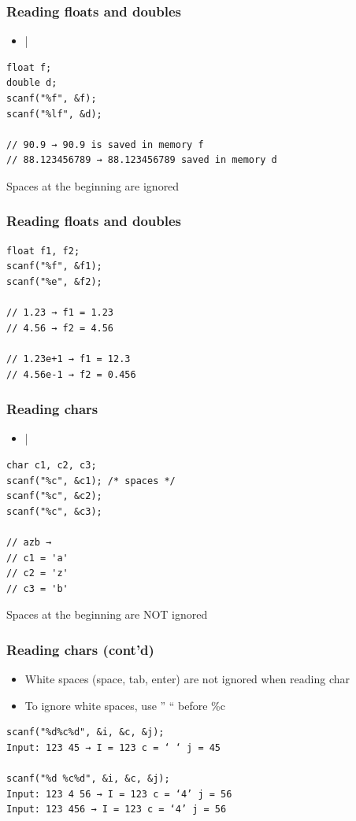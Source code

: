 \documentclass{../c-lecture}
\begin{document}
\begin{frame}[fragile]
  \frametitle{Reading floats and doubles}
  \begin{itemize}
    \item {}|%
  \end{itemize}
  \begin{verbatim}
float f;
double d;
scanf("%f", &f);
scanf("%lf", &d);

// 90.9 → 90.9 is saved in memory f
// 88.123456789 → 88.123456789 saved in memory d
  \end{verbatim}
  \begin{block}{}
  Spaces at the beginning are ignored
  \end{block}
\end{frame}

\begin{frame}[fragile]
  \frametitle{Reading floats and doubles}
  \begin{verbatim}
float f1, f2;
scanf("%f", &f1);
scanf("%e", &f2);

// 1.23 → f1 = 1.23
// 4.56 → f2 = 4.56

// 1.23e+1 → f1 = 12.3
// 4.56e-1 → f2 = 0.456
  \end{verbatim}
\end{frame}

\begin{frame}[fragile]
  \frametitle{Reading chars}
  \begin{itemize}
    \item {}|%
  \end{itemize}
  \begin{verbatim}
char c1, c2, c3;
scanf("%c", &c1); /* spaces */
scanf("%c", &c2);
scanf("%c", &c3);

// azb →
// c1 = 'a'
// c2 = 'z'
// c3 = 'b'
  \end{verbatim}
  \begin{block}{}
  Spaces at the beginning are NOT ignored
  \end{block}
\end{frame}

\begin{frame}[fragile]
  \frametitle{Reading chars (cont’d)}
  \begin{itemize}
    \item White spaces (space, tab, enter) are not ignored when reading char
    \item To ignore white spaces, use '' `` before \%c
  \end{itemize}
  \begin{verbatim}
scanf("%d%c%d", &i, &c, &j);
Input: 123 45 → I = 123 c = ‘ ‘ j = 45

scanf("%d %c%d", &i, &c, &j);
Input: 123 4 56 → I = 123 c = ‘4’ j = 56
Input: 123 456 → I = 123 c = ‘4’ j = 56
  \end{verbatim}
\end{frame}
\end{document}
